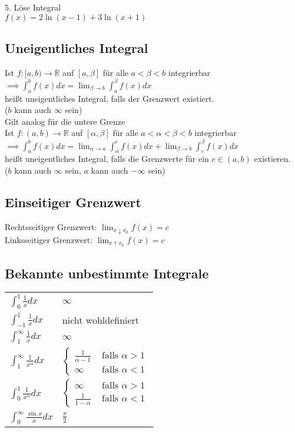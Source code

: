 \documentclass[a4paper,9pt]{extarticle}
\newcommand{\intab}[1] {\int_{a}^{b} #1 dx}
\begin{document}
	5. Löse Integral \\
	$f(x) = 2\ln(x-1) + 3\ln(x+1)$
	
	
	\subsection*{Uneigentliches Integral}
	Ist $f : [a,b) → \mathbb{R}$ auf $[a,\beta]$ für alle $a < \beta < b$ integrierbar \\
	$\implies \intab{f(x)} = \lim_{\beta → b} \int_a^{\beta} f(x) dx$ \\
	heißt uneigentliches Integral, falls der Grenzwert existiert. \\
	($b$ kann auch $∞$ sein) \\
	
	Gilt analog für die untere Grenze \\
	
	Ist $f : (a,b) → \mathbb{R}$ auf $[\alpha,\beta]$ für alle $a < \alpha < \beta < b$ integrierbar \\
	$\implies \intab{f(x)} = \lim_{\alpha → a} \int_{\alpha}^c f(x) dx + \lim_{\beta → b} \int_c^{\beta} f(x) dx$ \\
	heißt uneigentliches Integral, falls die Grenzwerte für ein $c \in (a,b)$ existieren. \\
	($b$ kann auch $∞$ sein, $a$ kann auch $-∞$ sein)
	
	\subsection*{Einseitiger Grenzwert}
	Rechtsseitiger Grenzwert: $\lim_{x ↓ x_0} f(x) = c$ \\
	Linksseitiger Grenzwert: $\lim_{x ↑ x_0} f(x) = c$ \\
	
	\subsection*{Bekannte unbestimmte Integrale}
	\begin{tabular}{l @{ $=$ } l}
		$\int_0^1 \frac{1}{x} dx$ & $∞$ \\
		$\int_{-1}^1 \frac{1}{x} dx$ & nicht wohldefiniert \\
		$\int_1^∞ \frac{1}{x} dx$ & $∞$ \\
		$\int_1^∞ \frac{1}{x^{\alpha}} dx$ & $\begin{cases}
				\frac{1}{\alpha - 1} & \text{ falls } \alpha > 1 \\
				∞ & \text{ falls } \alpha < 1
			\end{cases}$ \\
		$\int_0^1 \frac{1}{x^{\alpha}} dx$ & $\begin{cases}
		∞ & \text{ falls } \alpha > 1 \\
		\frac{1}{1 - \alpha} & \text{ falls } \alpha < 1
		\end{cases}$ \\
		$\int_0^∞ \frac{\sin x}{x} dx$ & $\frac{\pi}{2}$
	\end{tabular}
\end{document}
